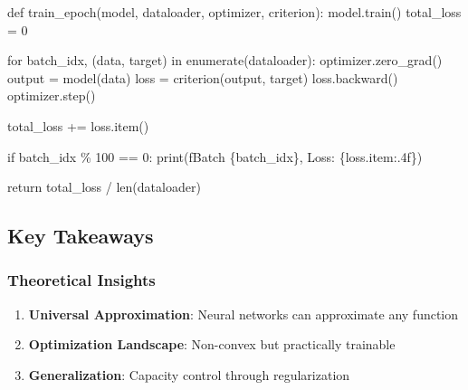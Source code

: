 \documentclass[
  11pt,
  letterpaper,
]{article}
\newenvironment{Shaded}{}{}
\newcommand{\BuiltInTok}[1]{\textcolor[rgb]{0.84,0.23,0.29}{#1}}
\newcommand{\ControlFlowTok}[1]{\textcolor[rgb]{0.84,0.23,0.29}{#1}}
\newcommand{\DecValTok}[1]{\textcolor[rgb]{0.00,0.36,0.77}{#1}}
\newcommand{\KeywordTok}[1]{\textcolor[rgb]{0.84,0.23,0.29}{#1}}
\newcommand{\NormalTok}[1]{\textcolor[rgb]{0.14,0.16,0.18}{#1}}
\newcommand{\OperatorTok}[1]{\textcolor[rgb]{0.14,0.16,0.18}{#1}}
\newcommand{\SpecialCharTok}[1]{\textcolor[rgb]{0.00,0.36,0.77}{#1}}
\newcommand{\SpecialStringTok}[1]{\textcolor[rgb]{0.01,0.18,0.38}{#1}}
\providecommand{\tightlist}{%
  \setlength{\itemsep}{0pt}\setlength{\parskip}{0pt}}
\begin{document}
\begin{Shaded}
\begin{Highlighting}[]
\KeywordTok{def}\NormalTok{ train\_epoch(model, dataloader, optimizer, criterion):}
\NormalTok{    model.train()}
\NormalTok{    total\_loss }\OperatorTok{=} \DecValTok{0}
    
    \ControlFlowTok{for}\NormalTok{ batch\_idx, (data, target) }\KeywordTok{in} \BuiltInTok{enumerate}\NormalTok{(dataloader):}
\NormalTok{        optimizer.zero\_grad()}
\NormalTok{        output }\OperatorTok{=}\NormalTok{ model(data)}
\NormalTok{        loss }\OperatorTok{=}\NormalTok{ criterion(output, target)}
\NormalTok{        loss.backward()}
\NormalTok{        optimizer.step()}
        
\NormalTok{        total\_loss }\OperatorTok{+=}\NormalTok{ loss.item()}
        
        \ControlFlowTok{if}\NormalTok{ batch\_idx }\OperatorTok{\%} \DecValTok{100} \OperatorTok{==} \DecValTok{0}\NormalTok{:}
            \BuiltInTok{print}\NormalTok{(}\SpecialStringTok{f\textquotesingle{}Batch }\SpecialCharTok{\{}\NormalTok{batch\_idx}\SpecialCharTok{\}}\SpecialStringTok{, Loss: }\SpecialCharTok{\{}\NormalTok{loss}\SpecialCharTok{.}\NormalTok{item}\SpecialCharTok{:.4f\}}\SpecialStringTok{\textquotesingle{}}\NormalTok{)}
    
    \ControlFlowTok{return}\NormalTok{ total\_loss }\OperatorTok{/} \BuiltInTok{len}\NormalTok{(dataloader)}
\end{Highlighting}
\end{Shaded}

\subsection{Key Takeaways}\label{key-takeaways}

\subsubsection{Theoretical Insights}\label{theoretical-insights}

\begin{enumerate}
\def\labelenumi{\arabic{enumi}.}
\tightlist
\item
  \textbf{Universal Approximation}: Neural networks can approximate any
  function
\item
  \textbf{Optimization Landscape}: Non-convex but practically trainable
\item
  \textbf{Generalization}: Capacity control through regularization
\end{enumerate}
\end{document}
